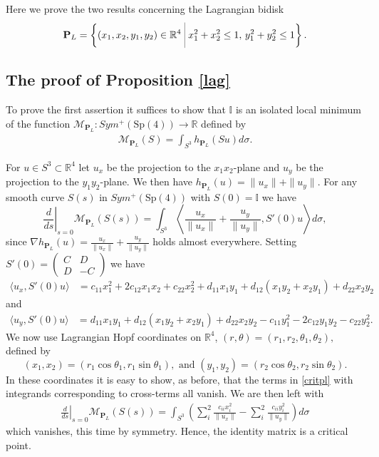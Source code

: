 \documentclass[12pt]{amsart}
\theoremstyle{definition}
\def\bigmid{\ \rule[-3.5mm]{0.1mm}{9mm}\ }
\newcommand{\II}{{\mathbb I}}
\newcommand{\RR}{{\mathbb R}}
\begin{document}
Here we prove the two results concerning the Lagrangian bidisk $$\mathbf{P}_L = \left\{ (x_1, x_{2}, y_1, y_{2}) \in \mathbb{R}^{4} \bigmid  x_1^2 +x_2^2 \leq 1,\, y_1^2 +y_2^2 \leq 1\right\}.$$ 


\subsection{The proof of Proposition \ref{lag}} To prove the first assertion it suffices to show that $\II$ is an isolated local minimum of the function  $\mathcal{M}_{\mathbf{P}_L} \colon Sym^+(\mathrm{Sp}(4)) \to \mathbb{R}$ defined by
\begin{align*}
    \mathcal{M}_{\mathbf{P}_L}(S) = \int_{S^{3}} h_{\mathbf{P}_L}(S u) d\sigma.
\end{align*}


For  $u \in S^{3} \subset \RR^{4}$ let $u_x$ be the projection to the $x_1x_2$-plane and $u_y$ be the projection to the $y_1y_2$-plane. We then have $h_{\mathbf{P}_L}(u) =  \|u_x\| + \|u_y \|.$ For any smooth curve $S(s)$ in $Sym^+(\mathrm{Sp}(4))$ with $S(0) = \II$  we have 
\begin{equation}\label{critpl}
    \left.\frac{d}{ds}\right|_{s=0} \mathcal{M}_{\mathbf{P}_L} (S(s)) = \int_{S^{3}} \left\langle \frac{u_x}{\|u_x\|}+\frac{u_y}{\|u_y\|}, S'(0)u \right\rangle d\sigma,
\end{equation}
since  $\nabla h_{\mathbf{P}_L}(u)=\frac{u_x}{\|u_x\|}+\frac{u_y}{\|u_y\|}$ holds almost everywhere.
Setting $S'(0) = \begin{pmatrix} C & D\\ D & -C \end{pmatrix}$ we have
\begin{align*}
    \langle u_x, S'(0)u \rangle &= c_{11}x_1^2 +2c_{12}x_1x_2 + c_{22}x_2^2 +d_{11}x_1y_1+d_{12}(x_1y_2+ x_2y_1) + d_{22}x_2y_2
\end{align*}
and
\begin{align*}
    \langle u_y, S'(0)u \rangle &= d_{11}x_1y_1+d_{12}(x_1y_2+ x_2y_1) + d_{22}x_2y_2 - c_{11}y_1^2 -2c_{12}y_1y_2 - c_{22}y_2^2.
\end{align*}
We now use Lagrangian Hopf coordinates on $\RR^{4}$, $(r, \theta) = (r_1, r_{2}, \theta_1, \theta_{2}),$ defined by $$(x_1,x_2) = (r_1 \cos{\theta_1}, r_1 \sin{\theta_1}), \text{ and  }(y_{1},y_{2}) = (r_{2} \cos{\theta_{2}}, r_{2} \sin{\theta_{2}}).$$ In these coordinates it is easy to show, as before, that the terms 
in \eqref{critpl} with integrands corresponding to cross-terms all vanish.  We are then left with
\begin{align*}
    \left.\frac{d}{ds}\right|_{s=0} \mathcal{M}_{\mathbf{P}_L} (S(s)) = \int_{S^{3}} \left( \sum_i^{2}\frac{ c_{ii}x_i^2}{\|u_x\|}-\sum_i^{2}\frac{ c_{ii}y_i^2}{\|u_y\|}\right) d\sigma
\end{align*}
which vanishes, this time by symmetry. Hence, the identity matrix is a critical point.
\end{document}
